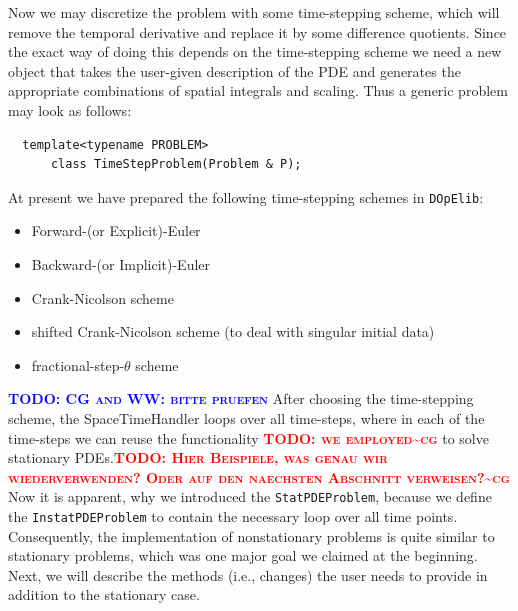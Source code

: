 \documentclass[smallextended]{svjour3}       %
\numberwithin{equation}{section}
\newcommand{\dope}{\texttt{DOpElib}}
\newcommand{\todo}[1]{\textbf{\textsc{\textcolor{blue}{TODO: #1}}}}
\newcommand{\todocg}[1]{\textbf{\textsc{\textcolor{red}{TODO: #1\textasciitilde cg}}}}
\begin{document}
Now we may discretize the problem with some time-stepping scheme, which will 
remove the temporal derivative and replace it by some difference quotients. 
Since the exact way of doing this depends on the time-stepping scheme 
we need a new object that takes the user-given description of the PDE and 
generates the appropriate combinations of spatial integrals and scaling.
Thus a generic problem may look as follows:
\begin{lstlisting}
  template<typename PROBLEM>
      class TimeStepProblem(Problem & P);
\end{lstlisting}
At present we have prepared the following time-stepping schemes in \dope:
\begin{itemize}
\item Forward-(or Explicit)-Euler
\item Backward-(or Implicit)-Euler
\item Crank-Nicolson scheme
\item shifted Crank-Nicolson scheme (to deal with singular initial data)
\item fractional-step-$\theta$ scheme
\end{itemize}
\todo{CG and WW: bitte pruefen}
After choosing the time-stepping scheme, the SpaceTimeHandler  
loops over all time-steps, where in each of the 
time-steps we can reuse the functionality \todocg{we employed} to solve stationary PDEs.\todocg{Hier Beispiele, was genau wir wiederverwenden? Oder auf den naechsten Abschnitt verweisen?} 
Now it is apparent, why we introduced the \texttt{StatPDEProblem}, because
we define the \texttt{InstatPDEProblem} to contain the necessary 
loop over all time points. Consequently, the implementation 
of nonstationary problems is quite similar to stationary problems,
which was one major goal we claimed at the beginning.
Next, we will describe the methods (i.e., changes) the user needs to 
provide in addition to the stationary case.
\end{document}
